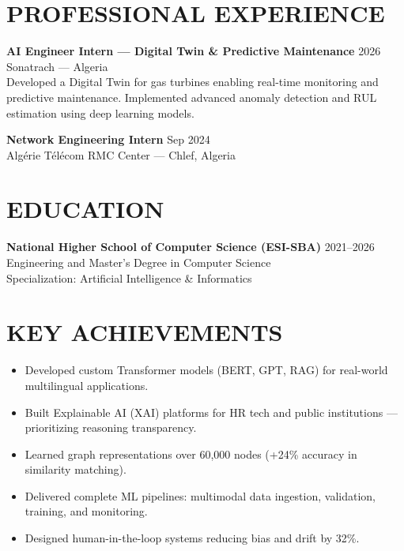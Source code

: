 \documentclass[a4paper,12pt]{article}
\begin{document}
\section{PROFESSIONAL EXPERIENCE}
\textbf{AI Engineer Intern — Digital Twin \& Predictive Maintenance} \hfill 2026 \\
Sonatrach — Algeria \\
Developed a Digital Twin for gas turbines enabling real-time monitoring and predictive maintenance. Implemented advanced anomaly detection and RUL estimation using deep learning models.

\textbf{Network Engineering Intern} \hfill Sep 2024 \\
Algérie Télécom RMC Center — Chlef, Algeria

\section{EDUCATION}
\textbf{National Higher School of Computer Science (ESI-SBA)} \hfill 2021--2026 \\
Engineering and Master’s Degree in Computer Science \\
Specialization: Artificial Intelligence \& Informatics

\section{KEY ACHIEVEMENTS}
\begin{itemize}
    \item Developed custom Transformer models (BERT, GPT, RAG) for real-world multilingual applications.
    \item Built Explainable AI (XAI) platforms for HR tech and public institutions — prioritizing reasoning transparency.
    \item Learned graph representations over 60,000 nodes (+24\% accuracy in similarity matching).
    \item Delivered complete ML pipelines: multimodal data ingestion, validation, training, and monitoring.
    \item Designed human-in-the-loop systems reducing bias and drift by 32\%.
\end{itemize}

\end{document}
